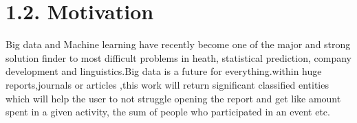 \section*{1.2. Motivation}
Big data and Machine learning have recently become one of the major and strong solution finder to most difficult problems in heath, statistical prediction, company development and linguistics.Big data is a future for everything.within huge reports,journals or articles ,this work will return significant  classified entities which will help the user to not struggle opening the report and get like amount spent in a given activity, the sum of people who participated in an event etc.




%
% 

